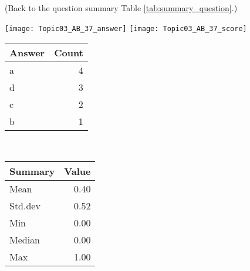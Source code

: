 \documentclass[12pt,english,nohyper]{tufte-handout}\usepackage[]{graphicx}\usepackage[]{color}
\begin{document}
 (Back to the question summary Table \ref{tab:summary_question}.)

\begin{center} \texttt{[image: Topic03\_AB\_37\_answer]} \texttt{[image: Topic03\_AB\_37\_score]} \end{center} 

\begin{center}%
\begin{tabular}{lr}
  \hline
Answer & Count \\ 
  \hline
a &   4 \\ 
  d &   3 \\ 
  c &   2 \\ 
  b &   1 \\ 
   \hline
\end{tabular}
~~~~~~~~%
\begin{tabular}{lr}
  \hline
Summary & Value \\ 
  \hline
Mean & 0.40 \\ 
  Std.dev & 0.52 \\ 
  Min & 0.00 \\ 
  Median & 0.00 \\ 
  Max & 1.00 \\ 
   \hline
\end{tabular}
\end{center}\newpage{}
\end{document}
